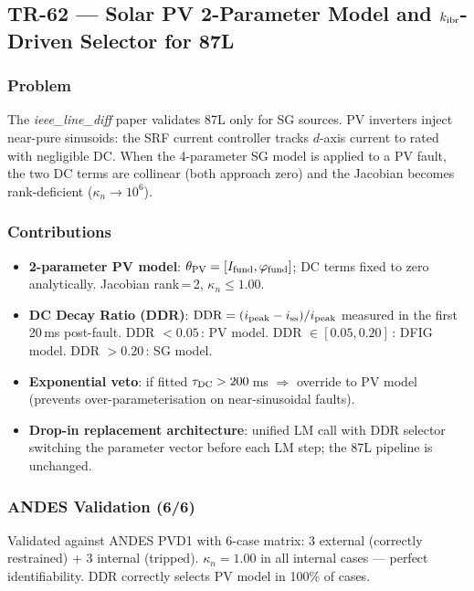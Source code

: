 \documentclass[12pt,a4paper]{article}
\newcommand{\kn}{\kappa_n}
\begin{document}
\bigskip

\subsection{TR-62 — Solar PV 2-Parameter Model and $k_{\rm ibr}$-Driven Selector for 87L}
\label{sec:tr62}

\subsubsection{Problem}
The \textit{ieee\_line\_diff} paper validates 87L only for SG sources.
PV inverters inject near-pure sinusoids: the SRF current controller tracks
$d$-axis current to rated with negligible DC.  When the 4-parameter SG model
is applied to a PV fault, the two DC terms are collinear (both approach zero)
and the Jacobian becomes rank-deficient ($\kn \to 10^6$).

\subsubsection{Contributions}
\begin{itemize}
  \item \textbf{2-parameter PV model}: $\theta_{\rm PV} = [I_{\rm fund}, \varphi_{\rm fund}]$;
    DC terms fixed to zero analytically.  Jacobian rank\,=\,2, $\kn \le 1.00$.
  \item \textbf{DC Decay Ratio (DDR)}: $\text{DDR} = (i_{\rm peak} - i_{\rm ss})/i_{\rm peak}$
    measured in the first 20\,ms post-fault.
    DDR $< 0.05$\,: PV model.  DDR $\in [0.05, 0.20]$\,: DFIG model.
    DDR $> 0.20$\,: SG model.
  \item \textbf{Exponential veto}: if fitted $\tau_{\rm DC} > 200$\,ms $\Rightarrow$
    override to PV model (prevents over-parameterisation on near-sinusoidal faults).
  \item \textbf{Drop-in replacement architecture}: unified LM call with DDR selector
    switching the parameter vector before each LM step; the 87L pipeline is unchanged.
\end{itemize}

\subsubsection{ANDES Validation (6/6)}
Validated against ANDES PVD1 with 6-case matrix:
3 external (correctly restrained) + 3 internal (tripped).
$\kn = 1.00$ in all internal cases — perfect identifiability.
DDR correctly selects PV model in 100\% of cases.
\end{document}
